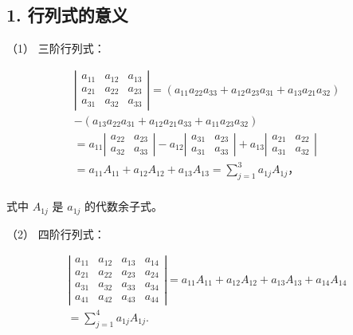 \subsection{1. 行列式的意义}

（1） 三阶行列式：

\[
\begin{array}{l} \left| \begin{array}{ccc} a _ {11} & a _ {12} & a _ {13} \\ a _ {21} & a _ {22} & a _ {23} \\ a _ {31} & a _ {32} & a _ {33} \end{array} \right| = (a _ {11} a _ {22} a _ {33} + a _ {12} a _ {23} a _ {31} + a _ {13} a _ {21} a _ {32}) \\ - \left(a _ {13} a _ {22} a _ {31} + a _ {12} a _ {21} a _ {33} + a _ {11} a _ {23} a _ {32}\right) \\ = a _ {11} \left| \begin{array}{ll} a _ {22} & a _ {23} \\ a _ {32} & a _ {33} \end{array} \right| - a _ {12} \left| \begin{array}{ll} a _ {31} & a _ {23} \\ a _ {31} & a _ {33} \end{array} \right| + a _ {13} \left| \begin{array}{ll} a _ {21} & a _ {22} \\ a _ {31} & a _ {32} \end{array} \right| \\ = a _ {11} A _ {11} + a _ {12} A _ {12} + a _ {13} A _ {13} = \sum_ {j = 1} ^ {3} a _ {1 j} A _ {1 j}\text{，} \\ \end{array}
\]

式中 \(A_{1j}\) 是 \(a_{1j}\) 的代数余子式。

（2） 四阶行列式：

\[
\begin{array}{l} \left| \begin{array}{cccc} a _ {11} & a _ {12} & a _ {13} & a _ {14} \\ a _ {21} & a _ {22} & a _ {23} & a _ {24} \\ a _ {31} & a _ {32} & a _ {33} & a _ {34} \\ a _ {41} & a _ {42} & a _ {43} & a _ {44} \end{array} \right| = a _ {11} A _ {11} + a _ {12} A _ {12} + a _ {13} A _ {13} + a _ {14} A _ {14} \\ = \sum_ {j = 1} ^ {4} a _ {1 j} A _ {1 j}. \\ \end{array}
\]

